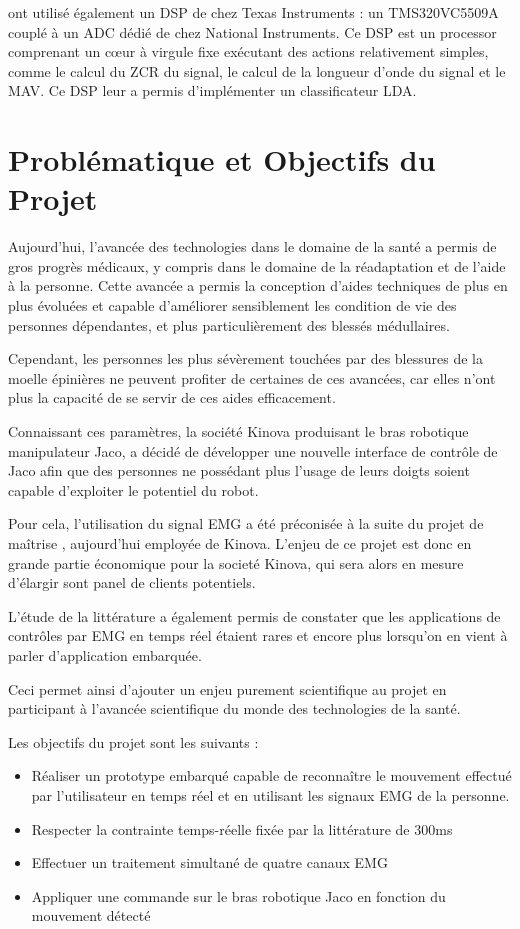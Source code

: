 \documentclass[letterpaper, twoside, 12pt, memoire, creativecommons, hyperref]{thETS}
\begin{document}
\cite{Tenore2007} ont utilisé également un DSP de chez Texas Instruments : un TMS320VC5509A couplé à un ADC dédié de chez National Instruments. Ce DSP est un processor comprenant un cœur à virgule fixe exécutant des actions relativement simples, comme le calcul du ZCR du signal, le calcul de la longueur d’onde du signal et le MAV. Ce DSP leur a permis d'implémenter un classificateur LDA.

\chapter{Problématique et Objectifs du Projet}

Aujourd'hui, l'avancée des technologies dans le domaine de la santé a permis de gros progrès médicaux, y compris dans le domaine de la réadaptation et de l'aide à la personne. Cette avancée a permis la conception d'aides techniques de plus en plus évoluées et capable d'améliorer sensiblement les condition de vie des personnes dépendantes, et plus particulièrement des blessés médullaires. 

Cependant, les personnes les plus sévèrement touchées par des blessures de la moelle épinières ne peuvent profiter de certaines de ces avancées, car elles n'ont plus la capacité de se servir de ces aides efficacement. 

Connaissant ces paramètres, la société Kinova produisant le bras robotique manipulateur Jaco, a décidé de développer une nouvelle interface de contrôle de Jaco afin que des personnes ne possédant plus l'usage de leurs doigts soient capable d'exploiter le potentiel du robot.

Pour cela, l'utilisation du signal EMG a été préconisée à la suite du projet de maîtrise \cite{Maheu2011}, aujourd'hui employée de Kinova. L'enjeu de ce projet est donc en grande partie économique pour la societé Kinova, qui sera alors en mesure d'élargir sont panel de clients potentiels.

L'étude de la littérature a également permis de constater que les applications de contrôles par EMG en temps réel étaient rares et encore plus lorsqu'on en vient à parler d'application embarquée.

Ceci permet ainsi d'ajouter un enjeu purement scientifique au projet en participant à l'avancée scientifique du monde des technologies de la santé.

Les objectifs du projet sont les suivants : 

\begin{itemize}
 \item Réaliser un prototype embarqué capable de reconnaître le mouvement effectué par l'utilisateur en temps réel et en utilisant les signaux EMG de la personne.
 \item Respecter la contrainte temps-réelle fixée par la littérature de 300ms
 \item Effectuer un traitement simultané de quatre canaux EMG
 \item Appliquer une commande sur le bras robotique Jaco en fonction du mouvement détecté
\end{itemize}
\end{document}
